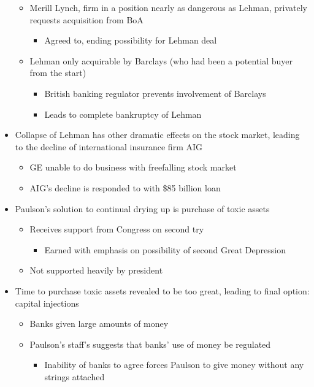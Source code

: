 \documentclass{article}
\begin{document}
\begin{itemize}
\begin{itemize}
\begin{itemize}
            \end{itemize}
            \item Merill Lynch, firm in a position nearly as dangerous as Lehman, privately requests acquisition from BoA 
            \begin{itemize}
                \item Agreed to, ending possibility for Lehman deal
            \end{itemize}
            \item Lehman only acquirable by Barclays (who had been a potential buyer from the start)
            \begin{itemize}
                \item British banking regulator prevents involvement of Barclays
                \item Leads to complete bankruptcy of Lehman
            \end{itemize}
        \end{itemize}
        \item Collapse of Lehman has other dramatic effects on the stock market, leading to the decline of international insurance firm AIG
        \begin{itemize}
            \item GE unable to do business with freefalling stock market
            \item AIG's decline is responded to with \$85 billion loan 
        \end{itemize}
        \item Paulson's solution to continual drying up is purchase of toxic assets
        \begin{itemize}
            \item Receives support from Congress on second try
            \begin{itemize}
                \item Earned with emphasis on possibility of second Great Depression
            \end{itemize}
            \item Not supported heavily by president
        \end{itemize}
        \item Time to purchase toxic assets revealed to be too great, leading to final option: capital injections 
        \begin{itemize}
            \item Banks given large amounts of money
            \item Paulson's staff's suggests that banks' use of money be regulated
            \begin{itemize}
                \item Inability of banks to agree forces Paulson to give money without any strings attached
            \end{itemize}
        \end{itemize}
    \end{itemize}
\end{document}
